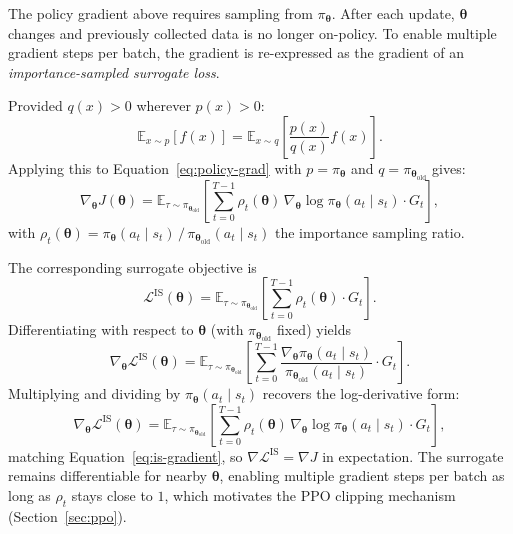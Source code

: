 The policy gradient above requires sampling from $\pi_{\boldsymbol{\theta}}$. After each update, $\boldsymbol{\theta}$ changes and previously collected data is no longer on-policy. To enable multiple gradient steps per batch, the gradient is re-expressed as the gradient of an \emph{importance-sampled surrogate loss}.

\medskip

Provided $q(x) > 0$ wherever $p(x) > 0$:
\begin{equation}
\mathbb{E}_{x \sim p}[f(x)] 
= \mathbb{E}_{x \sim q}\!\left[\frac{p(x)}{q(x)} f(x)\right].
\end{equation}
Applying this to Equation~\ref{eq:policy-grad} with $p = \pi_{\boldsymbol{\theta}}$ and $q = \pi_{\boldsymbol{\theta}_{\text{old}}}$ gives:
\begin{equation}
\nabla_{\boldsymbol{\theta}} J(\boldsymbol{\theta}) 
= \mathbb{E}_{\tau \sim \pi_{\boldsymbol{\theta}_{\text{old}}}}\!\left[
\sum_{t=0}^{T-1} \rho_t(\boldsymbol{\theta})\, 
\nabla_{\boldsymbol{\theta}} \log \pi_{\boldsymbol{\theta}}(a_t \mid s_t) \cdot G_t
\right],
\label{eq:is-gradient}
\end{equation}
with $\rho_t(\boldsymbol{\theta}) = \pi_{\boldsymbol{\theta}}(a_t \mid s_t) 
\,/\, \pi_{\boldsymbol{\theta}_{\text{old}}}(a_t \mid s_t)$ the 
importance sampling ratio.

\medskip

The corresponding surrogate objective is
\begin{equation}
\mathcal{L}^{\text{IS}}(\boldsymbol{\theta}) 
= \mathbb{E}_{\tau \sim \pi_{\boldsymbol{\theta}_{\text{old}}}}\!\left[
\sum_{t=0}^{T-1} \rho_t(\boldsymbol{\theta}) \cdot G_t \right].
\label{eq:is-surrogate}
\end{equation}
Differentiating with respect to $\boldsymbol{\theta}$ (with $\pi_{\boldsymbol{\theta}_{\text{old}}}$ fixed) yields
\begin{equation}
\nabla_{\boldsymbol{\theta}} \mathcal{L}^{\text{IS}}(\boldsymbol{\theta}) 
= \mathbb{E}_{\tau \sim \pi_{\boldsymbol{\theta}_{\text{old}}}}\!\left[
\sum_{t=0}^{T-1} \frac{\nabla_{\boldsymbol{\theta}} \pi_{\boldsymbol{\theta}}(a_t \mid s_t)}
{\pi_{\boldsymbol{\theta}_{\text{old}}}(a_t \mid s_t)} \cdot G_t \right].
\end{equation}
Multiplying and dividing by $\pi_{\boldsymbol{\theta}}(a_t \mid s_t)$ recovers the log-derivative form:
\begin{equation}
\nabla_{\boldsymbol{\theta}} \mathcal{L}^{\text{IS}}(\boldsymbol{\theta}) 
= \mathbb{E}_{\tau \sim \pi_{\boldsymbol{\theta}_{\text{old}}}}\!\left[
\sum_{t=0}^{T-1} \rho_t(\boldsymbol{\theta})\,
\nabla_{\boldsymbol{\theta}} \log \pi_{\boldsymbol{\theta}}(a_t \mid s_t) \cdot G_t \right],
\end{equation}
matching Equation~\ref{eq:is-gradient}, so $\nabla \mathcal{L}^{\text{IS}} = \nabla J$ in expectation. The surrogate remains differentiable for nearby $\boldsymbol{\theta}$, enabling multiple gradient steps per batch as long as $\rho_t$ stays close to $1$, which motivates the PPO clipping mechanism (Section~\ref{sec:ppo}).

